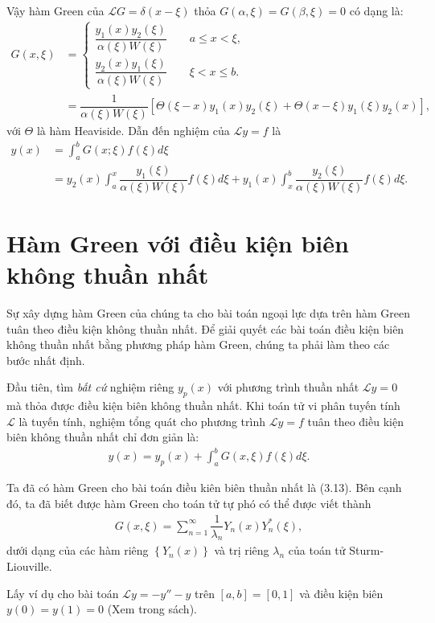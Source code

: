 \documentclass{report}
\newcommand{\f}[2]{\dfrac{#1}{#2}}
\begin{document}
Vậy hàm Green của $\mathcal{L} G = \delta (x-\xi)$ thỏa $G(\alpha,\xi) = G(\beta,\xi) = 0$ có dạng là:
\begin{align}
	G(x,\xi) 
	& = 
	\begin{cases}
		\f{y_{1}(x)y_{2}(\xi)}{\alpha(\xi)W(\xi)} \quad\quad a \leq x < \xi ,\\
		\f{y_{2}(x)y_{1}(\xi)}{\alpha(\xi)W(\xi)} \quad\quad \xi < x \leq b.
	\end{cases}\\
	& = \f{1}{\alpha(\xi) W(\xi)} \left[ \Theta(\xi - x)y_{1}(x)y_{2}(\xi) + \Theta(x-\xi)y_{1}(\xi)y_{2}(x) \right],
\end{align} 
với $\Theta$ là hàm Heaviside. Dẫn đến nghiệm của $\mathcal{L} y = f$ là
\begin{align}
	y(x) 
	& = \int_{a}^{b} G(x;\xi) f(\xi) d \xi \nonumber\\
	& = y_{2}(x) \int_{a}^{x} \f{y_{1}(\xi)}{\alpha(\xi) W(\xi)} f(\xi) d\xi + y_{1}(x) \int_{x}^{b} \f{y_{2}(\xi)}{\alpha(\xi)W(\xi)}f(\xi) d\xi.
\end{align}
\section{Hàm Green với điều kiện biên không thuần nhất}
Sự xây dựng hàm Green của chúng ta cho bài toán ngoại lực dựa trên hàm Green tuân theo điều kiện không thuần nhất. Để giải quyết các bài toán điều kiện biên không thuần nhất bằng phương pháp hàm Green, chúng ta phải làm theo các bước nhất định.

Đầu tiên, tìm \textit{bất cứ} nghiệm riêng $y_{p}(x)$ với phương trình thuần nhất $\mathcal{L}y = 0$ mà thỏa được điều kiện biên không thuần nhất. Khi toán tử vi phân tuyến tính $\mathcal{L}$ là tuyến tính, nghiệm tổng quát cho phương trình $\mathcal{L} y = f$ tuân theo điều kiện biên không thuần nhất chỉ đơn giản là:
\begin{align}
	y(x) = y_p(x) + \int_{a}^{b} G(x,\xi) f(\xi) d\xi.
\end{align}

Ta đã có hàm Green cho bài toán điều kiên biên thuần nhất là (3.13). Bên cạnh đó, ta đã biết được hàm Green cho toán tử tự phó có thể được viết thành
\begin{align}
	G(x,\xi) = \sum_{n = 1}^{\infty} \f{1}{\lambda_n} Y_n(x)Y_n^{*}(\xi),
\end{align}
dưới dạng của các hàm riêng $\left\{ Y_n(x) \right\}$ và trị riêng {$\lambda_n$} của toán tử Sturm-Liouville.

Lấy ví dụ cho bài toán $\mathcal{L} y = -y'' - y$ trên $\left[a,b\right] = \left[0,1\right]$ và điều kiện biên $y(0) = y(1) = 0$ (Xem trong sách).
\end{document}
